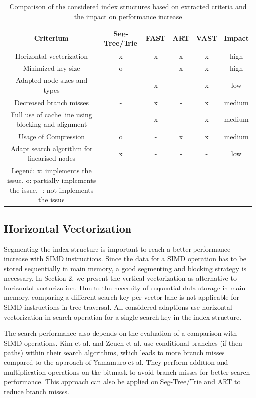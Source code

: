 \documentclass[conference]{IEEEtran}
\begin{document}
\begin{table}[htbp]
	\caption{Comparison of the considered index structures based on extracted criteria and the impact on performance increase}
	\begin{center}
		\begin{tabular}{|c|c|c|c|c|c|}
			\hline
			\textbf{Criterium}&\textbf{Seg-Tree/Trie}&\textbf{FAST}&\textbf{ART}&\textbf{VAST}&\textbf{Impact}\\
			\hline
			Horizontal vectorization & x & x & x & x & high\\
			Minimized key size & o & - & x & x & high\\
			Adapted node sizes and types & - & x & - & x & low\\
			Decreased branch misses & - & x & - & x & medium\\
			Full use of cache line using blocking and alignment & - & x & - & x & medium\\
			Usage of Compression & o & - & x & x & medium\\
			Adapt search algorithm for linearised nodes & x & - & - & - & low\\
			\hline
			Legend: x: implements the issue, o: partially implements the issue, -: not implements the issue & & & & &\\
			\hline
		\end{tabular}
		\label{tab1}
	\end{center}
\end{table}

\subsection{Horizontal Vectorization}
Segmenting the index structure is important to reach a better performance increase with SIMD instructions. Since the data for a SIMD operation has to be stored sequentially in main memory, a good segmenting and blocking strategy is necessary. In Section 2, we present the vertical vectorization as alternative to horizontal vectorization. Due to the necessity of sequential data storage in main memory, comparing a different search key per vector lane is not applicable for SIMD instructions in tree traversal. All considered adaptions use horizontal vectorization in search operation for a single search key in the index structure.

The search performance also depends on the evaluation of a comparison with SIMD operations. Kim et al. and Zeuch et al. use conditional branches (if-then paths) within their search algorithms, which leads to more branch misses compared to the approach of Yamamuro et al. They perform addition and multiplication operations on the bitmask to avoid branch misses for better search performance. This approach can also be applied on Seg-Tree/Trie and ART to reduce branch misses.
\end{document}
